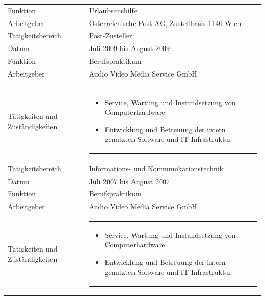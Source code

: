 \begin{longtable}{p{}|p{}}
	Funktion & Urlaubsaushilfe \\
	Arbeitgeber & Österreichische Post AG, Zustellbasis 1140 Wien \\
	Tätigkeitsbereich & Post-Zusteller \\ \bottomrule
	Datum & Juli 2009 bis August 2009 \\
	Funktion & Berufspraktikum \\
	Arbeitgeber & Audio Video Media Service GmbH \\
	Tätigkeiten und Zuständigkeiten &
	\begin{tabular} {m{} m{} }
	\begin{itemize}[nosep,leftmargin=1em] 
	\item Service, Wartung und Instandsetzung von Computerhardware
    \item Entwicklung und Betreuung der intern genutzten Software und IT-Infrastruktur
	\end{itemize}
	\end{tabular}
	\\
	Tätigkeitsbereich & Informations- und Kommunikationstechnik \\
	\bottomrule
	Datum & Juli 2007 bis August 2007 \\
	Funktion & Berufspraktikum \\
	Arbeitgeber & Audio Video Media Service GmbH \\
	Tätigkeiten und Zuständigkeiten &
	\begin{tabular} {m{} m{} }
	\begin{itemize}[nosep,leftmargin=1em]
	\item Service, Wartung und Instandsetzung von Computerhardware
	\item Entwicklung und Betreuung der intern genutzten Software und IT-Infrastruktur

\end{itemize}
\end{tabular}
\end{longtable}
